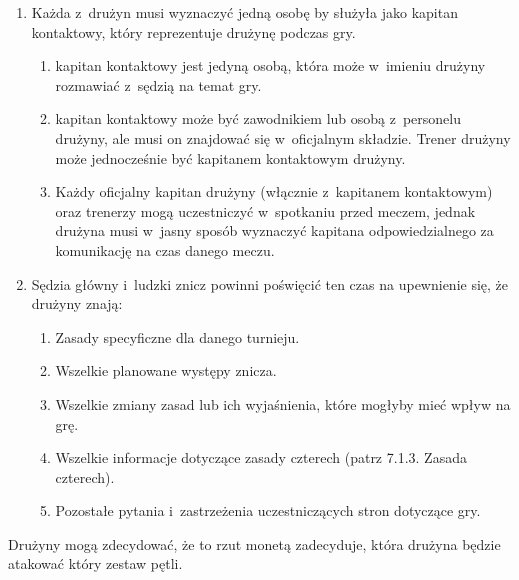 \documentclass[12pt,a4paper]{article}
\renewcommand{\subsubsection}[1]{
  \oldsubsubsection{#1}%
  \leftskip1.5cm
}
\begin{document}
\begin{enumerate}
	\item
	      Każda z~drużyn musi wyznaczyć jedną osobę by służyła jako kapitan
	      kontaktowy, który reprezentuje drużynę podczas gry.

	      \begin{enumerate}
		      \item
		            kapitan kontaktowy jest jedyną osobą, która może w~imieniu drużyny
		            rozmawiać z~sędzią na temat gry.
		      \item
		            kapitan kontaktowy może być zawodnikiem lub osobą z~personelu
		            drużyny, ale musi on znajdować się w~oficjalnym składzie. Trener
		            drużyny może jednocześnie być kapitanem kontaktowym drużyny.
		      \item
		            Każdy oficjalny kapitan drużyny (włącznie z~kapitanem kontaktowym)
		            oraz trenerzy mogą uczestniczyć w~spotkaniu przed meczem, jednak
		            drużyna musi w~jasny sposób wyznaczyć kapitana odpowiedzialnego za
		            komunikację na czas danego meczu.
	      \end{enumerate}
	\item
	      Sędzia główny i~ludzki znicz powinni poświęcić ten czas na upewnienie
	      się, że drużyny znają:

	      \begin{enumerate}
		      \item
		            Zasady specyficzne dla danego turnieju.
		      \item
		            Wszelkie planowane występy znicza.
		      \item
		            Wszelkie zmiany zasad lub ich wyjaśnienia, które mogłyby mieć wpływ
		            na grę.
		      \item
		            Wszelkie informacje dotyczące zasady czterech (patrz 7.1.3. Zasada
		            czterech).
		      \item
		            Pozostałe pytania i~zastrzeżenia uczestniczących stron dotyczące
		            gry.
	      \end{enumerate}
\end{enumerate}

\subsubsection{Rzut monetą}
Drużyny mogą zdecydować, że to rzut
monetą zadecyduje, która drużyna będzie atakować który zestaw pętli.
\end{document}
